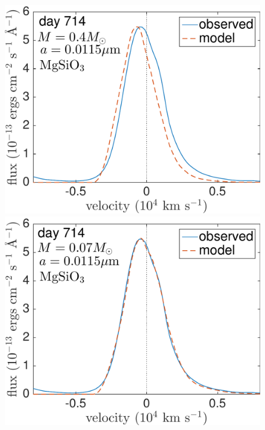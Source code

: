\begin{figure}
\includegraphics[trim =0 30 0 0,clip=true,scale=0.34]{chapters/chapter5/images/silicates_take2/MgSiO3_Dwek_Ha.pdf}
\hspace{3mm}
\includegraphics[trim =0 30 0 -10,clip=true,scale=0.34]{chapters/chapter5/images/silicates_take2/MgSiO3_bestfit_Ha.pdf}


\end{figure}
